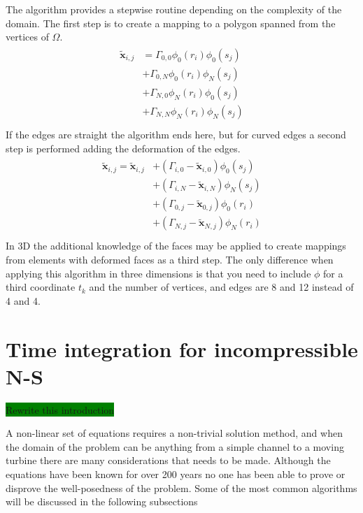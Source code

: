 The algorithm provides a stepwise routine depending on the complexity of the domain. The first step is to create 
a mapping to a polygon spanned from the vertices of $\Omega$.
%
\begin{align}
    \begin{split}
    \mathbf{\tilde{x}}_{i,j} 
             &=\Gamma_{0,0}\phi_0(r_i)\phi_0(s_j)\\
             &+\Gamma_{0,N}\phi_0(r_i)\phi_N(s_j)\\
             &+\Gamma_{N,0}\phi_N(r_i)\phi_0(s_j)\\
             &+\Gamma_{N,N}\phi_N(r_i)\phi_N(s_j)\\
    \end{split}
    \label{eq:gh1}
\end{align}
%
If the edges are straight the algorithm ends here, but for curved edges a second step is performed adding 
the deformation of the edges.
%
\begin{align}
    \begin{split}
        \mathbf{\tilde{x}}_{i,j}  = \mathbf{\tilde{x}}_{i,j} 
             &+(\Gamma_{i,0}-\mathbf{\tilde{x}}_{i,0})\phi_0(s_j)\\
             &+(\Gamma_{i,N}-\mathbf{\tilde{x}}_{i,N})\phi_N(s_j)\\
             &+(\Gamma_{0,j}-\mathbf{\tilde{x}}_{0,j})\phi_0(r_i)\\
             &+(\Gamma_{N,j}-\mathbf{\tilde{x}}_{N,j})\phi_N(r_i)\\
    \end{split}
    \label{eq:gh1}
\end{align}
%
In 3D the additional knowledge of the faces may be applied to create mappings from elements with deformed faces as a 
third step. The only difference when applying this algorithm in three dimensions is that you need to include $\phi$
for a third coordinate $t_k$ and the number of vertices, and edges are 8 and 12 instead of 
4 and 4.



\section{Time integration for incompressible N-S} \label{timeNS}
\colorbox{green}{Rewrite this introduction}

A non-linear set of equations requires a non-trivial solution method, and when the domain of the problem can be anything from a simple channel 
to a moving turbine there are many considerations that needs to be made. Although the equations have been known for over 200 years no one 
has been able to prove or disprove the well-posedness of the problem. Some of the most common algorithms 
will be discussed in the following subsections

